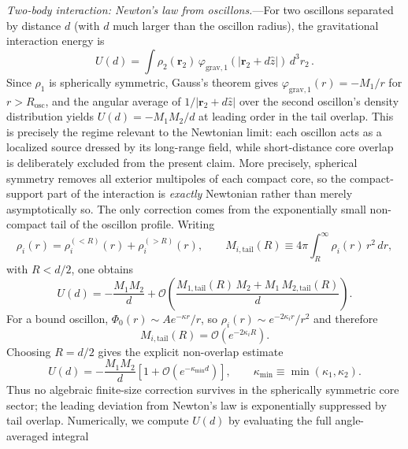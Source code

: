 \documentclass[aps,prd,onecolumn,superscriptaddress,nofootinbib,showpacs,12pt,notitlepage]{revtex4-2}
\renewcommand{\order}[1]{\mathcal{O}\!\left(#1\right)}
\begin{document}
\textit{Two-body interaction: Newton's law from
oscillons.}---For two oscillons separated by distance $d$
(with $d$ much larger than the oscillon radius), the
gravitational interaction energy is
\begin{equation}\label{eq:U_two_body}
  U(d) = \int\!\rho_2(\mathbf{r}_2)\,
  \varphi_{\mathrm{grav},1}(|\mathbf{r}_2 + d\hat{z}|)\,
  d^{3}r_2\,.
\end{equation}
Since $\rho_1$ is spherically symmetric,
Gauss's theorem gives
$\varphi_{\mathrm{grav},1}(r) = -M_1/r$ for
$r > R_{\mathrm{osc}}$, and the angular average of
$1/|\mathbf{r}_2 + d\hat{z}|$ over the second
oscillon's density distribution yields
$U(d) = -M_1 M_2/d$ at leading order in the tail overlap.
This is precisely the regime relevant to the Newtonian
limit: each oscillon acts as a localized source dressed by
its long-range field, while short-distance core overlap is
deliberately excluded from the present claim.
More precisely, spherical symmetry removes all exterior
multipoles of each compact core, so the compact-support part of
the interaction is \emph{exactly} Newtonian rather than merely
asymptotically so.  The only correction comes from the
exponentially small non-compact tail of the oscillon profile.
Writing
\begin{equation}
  \rho_i(r) = \rho_i^{(<R)}(r) + \rho_i^{(>R)}(r), \qquad
  M_{i,\mathrm{tail}}(R)
  \equiv 4\pi\!\int_R^\infty\!\rho_i(r)\,r^2\,dr,
\end{equation}
with $R < d/2$, one obtains
\begin{equation}
  U(d) = -\frac{M_1 M_2}{d}
  + \order{\frac{M_{1,\mathrm{tail}}(R)\,M_2
      + M_1\,M_{2,\mathrm{tail}}(R)}{d}}.
\end{equation}
For a bound oscillon,
$\Phi_0(r) \sim A e^{-\kappa r}/r$, so
$\rho_i(r) \sim e^{-2\kappa_i r}/r^2$ and therefore
\begin{equation}
  M_{i,\mathrm{tail}}(R) = \order{e^{-2\kappa_i R}}.
\end{equation}
Choosing $R = d/2$ gives the explicit non-overlap estimate
\begin{equation}
  U(d) = -\frac{M_1 M_2}{d}
  \left[1 + \order{e^{-\kappa_{\min} d}}\right],
  \qquad
  \kappa_{\min} \equiv \min(\kappa_1,\kappa_2).
\end{equation}
Thus no algebraic finite-size correction survives in the
spherically symmetric core sector; the leading deviation from
Newton's law is exponentially suppressed by tail overlap.
Numerically, we compute $U(d)$ by evaluating the
full angle-averaged integral
\end{document}
